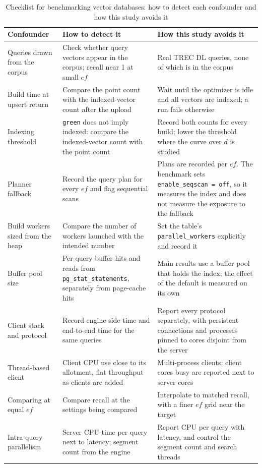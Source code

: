 \documentclass[preprint,12pt]{elsarticle}
\begin{document}
\begin{table}[t]
  \caption{Checklist for benchmarking vector databases: how to detect each confounder and
  how this study avoids it}
  \label{tab:checklist}
  \small
  \begin{tabular}{p{}p{}p{}}
    \toprule
    Confounder & How to detect it & How this study avoids it \\
    \midrule
    Queries drawn from the corpus &
      Check whether query vectors appear in the corpus; recall near 1 at small $ef$ &
      Real TREC DL queries, none of which is in the corpus \\
    Build time at upsert return &
      Compare the point count with the indexed-vector count after the upload &
      Wait until the optimizer is idle and all vectors are indexed; a run fails
      otherwise \\
    Indexing threshold &
      \texttt{green} does not imply indexed: compare the indexed-vector count with the
      point count &
      Record both counts for every build; lower the threshold where the curve over $d$
      is studied \\
    Planner fallback &
      Record the query plan for every $ef$ and flag sequential scans &
      Plans are recorded per $ef$. The benchmark sets \texttt{enable\_seqscan = off}, so
      it measures the index and does not measure the exposure to the fallback \\
    Build workers sized from the heap &
      Compare the number of workers launched with the intended number &
      Set the table's \texttt{parallel\_workers} explicitly and record it \\
    Buffer pool size &
      Per-query buffer hits and reads from \texttt{pg\_stat\_statements}, separately from
      page-cache hits &
      Main results use a buffer pool that holds the index; the effect of the default is
      measured on its own \\
    Client stack and protocol &
      Record engine-side time and end-to-end time for the same queries &
      Report every protocol separately, with persistent connections and processes
      pinned to cores disjoint from the server \\
    Thread-based client &
      Client CPU use close to its allotment, flat throughput as clients are added &
      Multi-process clients; client cores busy are reported next to server cores \\
    Comparing at equal $ef$ &
      Compare recall at the settings being compared &
      Interpolate to matched recall, with a finer $ef$ grid near the target \\
    Intra-query parallelism &
      Server CPU time per query next to latency; segment count from the engine &
      Report CPU per query with latency, and control the segment count and search
      threads \\
    \bottomrule
  \end{tabular}
\end{table}
\end{document}
